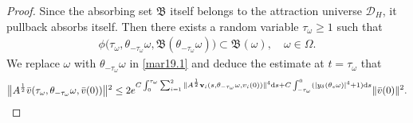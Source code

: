 \documentclass{elsarticle}
\theoremstyle{definition}
\numberwithin{equation}{section}
\newcommand{\D}{\mathcal{D}}
\newcommand{\B}{\mathfrak{B}}
\renewcommand{\d}{{\rm{d}}}
\begin{document}
\begin{proof}
Since the absorbing set $\mathfrak B$ itself belongs to the attraction universe $\D_H$,  it pullback absorbs itself. Then  there exists a random variable $\tau_\omega \geq 1$ such that
\begin{align}\label{mar18.2}
 \phi \big(\tau_\omega,\theta_{-\tau_\omega}\omega, \B(\theta_{-\tau_\omega}\omega)\big)
 \subset \B(\omega), \quad \omega\in \Omega.
\end{align}
We replace $\omega$ with $\theta_{-\tau_\omega} \omega$ in \eqref{mar19.1}  and deduce  the estimate at $t=\tau_\omega$ that
\begin{align}
  \big \|
 A^{\frac 12}  \bar {v}(\tau_\omega,\theta_{-\tau_\omega}\omega,  \bar v(0))  \big \| {^2}
 \leq  2e^{ C\int_{0}^{\tau_\omega}  \sum_{i=1}^2\|A^\frac12\textbf{v}_i(s, \theta_{-\tau_\omega}\omega, v_i(0)) \|^4 \d s+ C\int^0_{-\tau_\omega} (|y_\delta(\theta_s\omega)|^4+1) \d s}
   \|\bar v(0) \|^2 .  \label{mar18.1}
\end{align}


\end{proof}
\end{document}
